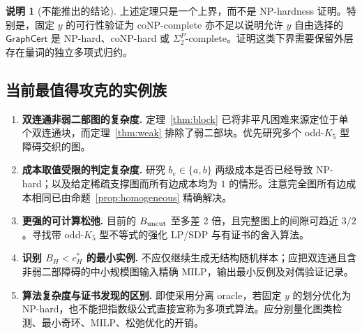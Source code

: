 \documentclass[11pt,a4paper]{ctexart}
\theoremstyle{definition}
\newtheorem{remark}[theorem]{说明}
\newcommand{\GraphCert}{\mathsf{GraphCert}}
\newcommand{\1}{\boldsymbol 1}
\begin{document}
\begin{remark}[不能推出的结论]
上述定理只是一个上界，而不是 NP-hardness 证明。特别是，固定 $y$ 的可行性验证为 coNP-complete 亦不足以说明允许 $y$ 自由选择的 $\GraphCert$ 是 NP-hard、coNP-hard 或 $\Sigma_2^P$-complete。证明这类下界需要保留外层存在量词的独立多项式归约。
\end{remark}

\subsection{当前最值得攻克的实例族}
\begin{enumerate}[label=\textbf{D1.\arabic*},leftmargin=*]
\item \textbf{双连通非弱二部图的复杂度.} 定理~\ref{thm:block} 已将非平凡困难来源定位于单个双连通块，而定理~\ref{thm:weak} 排除了弱二部块。优先研究多个 odd-$K_5$ 型障碍交织的图。
\item \textbf{成本取值受限的判定复杂度.} 研究 $b_e\in\{a,b\}$ 两级成本是否已经导致 NP-hard；以及给定稀疏支撑图而所有边成本均为 $1$ 的情形。注意完全图所有边成本相同已由命题~\ref{prop:homogeneous} 精确解决。
\item \textbf{更强的可计算松弛.} 目前的 $B_{\rm uncut}$ 至多差 2 倍，且完整图上的间隙可趋近 $3/2$。寻找带 odd-$K_5$ 型不等式的强化 LP/SDP 与有证书的舍入算法。
\item \textbf{识别 $B_H<c_H^*$ 的最小实例.} 不应仅继续生成无结构随机样本；应把双连通且含非弱二部障碍的中小规模图输入精确 MILP，输出最小反例及对偶验证记录。
\item \textbf{算法复杂度与证书发现的区别.} 即使采用分离 oracle，若固定 $y$ 的划分优化为 NP-hard，也不能把指数级公式直接宣称为多项式算法。应分别量化图类检测、最小奇环、MILP、松弛优化的开销。
\end{enumerate}
\end{document}
